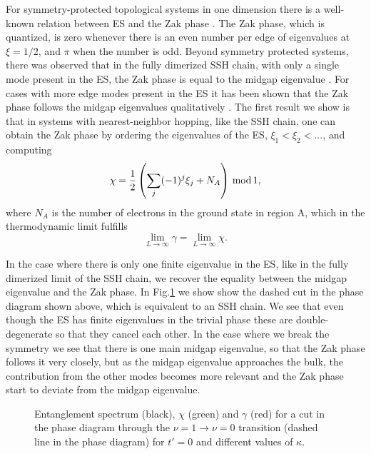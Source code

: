 \documentclass[twocolumn,amsmath,longbibliography,amssymb,superscriptaddress]{revtex4-1}
\begin{document}
For symmetry-protected topological systems in one dimension there is a well-known relation between ES and the Zak phase \cite{Peschel2008}. The Zak phase, which is quantized, is zero whenever there is an even number per edge of eigenvalues at $\xi = 1/2$, and $\pi$ when the number is odd. Beyond symmetry protected systems, there was observed that in the fully dimerized SSH chain, with only a single mode present in the ES, the Zak phase is equal to the midgap eigenvalue \cite{Ryu2006}. For cases with more edge modes present in the ES it has been shown that the Zak phase follows the midgap eigenvalues qualitatively \cite{Huang2012,Huang2012-2}. The first result we show is that in systems with nearest-neighbor hopping, like the SSH chain, one can obtain the Zak phase by ordering the eigenvalues of the ES, $\xi_1 < \xi_2 < ...$, and computing
\begin{equation}
\chi = \frac{1}{2}\left(\sum_j (-1)^j \xi_j+N_A\right) \, {\rm mod} \, 1,
\label{eqplusminus}
\end{equation}
where $N_A$ is the number of electrons in the ground state in region A, which in the thermodynamic limit fulfills
\begin{equation}
\lim_{L \rightarrow \infty} \gamma = \lim_{L \rightarrow \infty} \chi.
\end{equation}

In the case where there is only one finite eigenvalue in  the ES, like in the fully dimerized limit of the SSH chain, we recover the equality between the midgap eigenvalue and the Zak phase. In Fig.\ref{huang} we show show the dashed cut in the phase diagram shown above, which is equivalent to an SSH chain. We see that even though the ES has finite eigenvalues in the trivial phase these are double-degenerate so that they cancel each other. In the case where we break the symmetry we see that there is one main midgap eigenvalue, so that the Zak phase follows it very closely, but as the midgap eigenvalue approaches the bulk, the contribution from the other modes becomes more relevant and the Zak phase start to deviate from the midgap eigenvalue.
\begin{figure}[h!]
\centering
{}
\caption{Entanglement spectrum (black), $\chi$ (green) and $\gamma$ (red) for a cut in the phase diagram through the $\nu = 1 \rightarrow \nu = 0$ transition (dashed line in the phase diagram) for $t'=0$ and different values of $\kappa$.}
\label{huang}
\end{figure}
\end{document}
